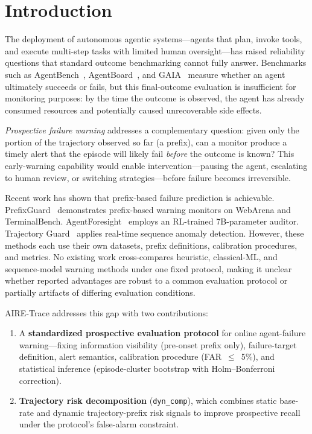 \documentclass[conference]{IEEEtran}
\begin{document}
\section{Introduction}

The deployment of autonomous agentic systems---agents that plan, invoke
tools, and execute multi-step tasks with limited human oversight---has
raised reliability questions that standard outcome benchmarking cannot
fully answer. Benchmarks such as AgentBench~\cite{b1},
AgentBoard~\cite{b2}, and GAIA~\cite{b3} measure whether an agent
ultimately succeeds or fails, but this final-outcome evaluation is
insufficient for monitoring purposes: by the time the outcome is
observed, the agent has already consumed resources and potentially caused
unrecoverable side effects.

\textit{Prospective failure warning} addresses a complementary question:
given only the portion of the trajectory observed so far (a prefix), can
a monitor produce a timely alert that the episode will likely fail
\textit{before} the outcome is known? This early-warning capability
would enable intervention---pausing the agent, escalating to human
review, or switching strategies---before failure becomes irreversible.

Recent work has shown that prefix-based failure prediction is
achievable. PrefixGuard~\cite{b7} demonstrates prefix-based warning
monitors on WebArena and TerminalBench. AgentForesight~\cite{b8} employs
an RL-trained 7B-parameter auditor. Trajectory Guard~\cite{b9} applies
real-time sequence anomaly detection. However, these methods each use
their own datasets, prefix definitions, calibration procedures, and
metrics. No existing work cross-compares heuristic, classical-ML, and
sequence-model warning methods under one fixed protocol, making it
unclear whether reported advantages are robust to a common evaluation
protocol or partially artifacts of differing evaluation conditions.

AIRE-Trace addresses this gap with two contributions:
\begin{enumerate}
\item A \textbf{standardized prospective evaluation protocol} for online
      agent-failure warning---fixing information visibility (pre-onset
      prefix only), failure-target definition, alert semantics,
      calibration procedure (FAR~$\leq$~5\%), and statistical inference
      (episode-cluster bootstrap with Holm--Bonferroni correction).
\item \textbf{Trajectory risk decomposition} (\texttt{dyn\_comp}), which
      combines static base-rate and dynamic trajectory-prefix risk
      signals to improve prospective recall under the protocol's
      false-alarm constraint.
\end{enumerate}
\end{document}
